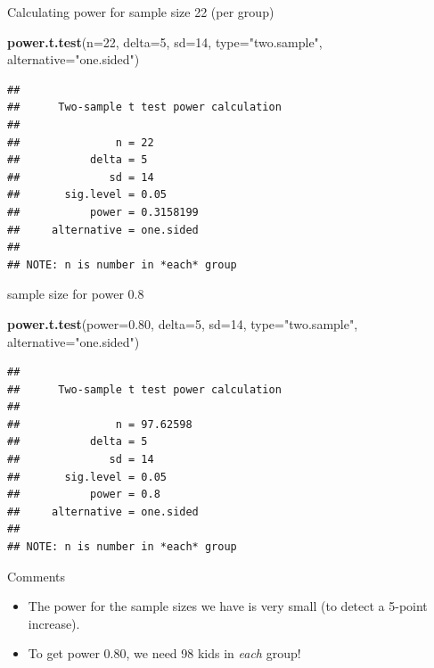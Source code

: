 \documentclass[ignorenonframetext,]{beamer}
\newenvironment{Shaded}{\begin{snugshade}}{\end{snugshade}}
\newcommand{\DataTypeTok}[1]{\textcolor[rgb]{0.13,0.29,0.53}{#1}}
\newcommand{\DecValTok}[1]{\textcolor[rgb]{0.00,0.00,0.81}{#1}}
\newcommand{\FloatTok}[1]{\textcolor[rgb]{0.00,0.00,0.81}{#1}}
\newcommand{\KeywordTok}[1]{\textcolor[rgb]{0.13,0.29,0.53}{\textbf{#1}}}
\newcommand{\NormalTok}[1]{#1}
\newcommand{\StringTok}[1]{\textcolor[rgb]{0.31,0.60,0.02}{#1}}
\providecommand{\tightlist}{%
  \setlength{\itemsep}{0pt}\setlength{\parskip}{0pt}}
\begin{document}
\begin{frame}[fragile]{Calculating power for sample size 22 (per group)}
\protect\hypertarget{calculating-power-for-sample-size-22-per-group}{}

\begin{Shaded}
\begin{Highlighting}[]
\KeywordTok{power.t.test}\NormalTok{(}\DataTypeTok{n=}\DecValTok{22}\NormalTok{, }\DataTypeTok{delta=}\DecValTok{5}\NormalTok{, }\DataTypeTok{sd=}\DecValTok{14}\NormalTok{, }\DataTypeTok{type=}\StringTok{"two.sample"}\NormalTok{, }
             \DataTypeTok{alternative=}\StringTok{"one.sided"}\NormalTok{)}
\end{Highlighting}
\end{Shaded}

\begin{verbatim}
## 
##      Two-sample t test power calculation 
## 
##               n = 22
##           delta = 5
##              sd = 14
##       sig.level = 0.05
##           power = 0.3158199
##     alternative = one.sided
## 
## NOTE: n is number in *each* group
\end{verbatim}

\end{frame}

\begin{frame}[fragile]{sample size for power 0.8}
\protect\hypertarget{sample-size-for-power-0.8}{}

\begin{Shaded}
\begin{Highlighting}[]
\KeywordTok{power.t.test}\NormalTok{(}\DataTypeTok{power=}\FloatTok{0.80}\NormalTok{, }\DataTypeTok{delta=}\DecValTok{5}\NormalTok{, }\DataTypeTok{sd=}\DecValTok{14}\NormalTok{, }\DataTypeTok{type=}\StringTok{"two.sample"}\NormalTok{, }
             \DataTypeTok{alternative=}\StringTok{"one.sided"}\NormalTok{)}
\end{Highlighting}
\end{Shaded}

\begin{verbatim}
## 
##      Two-sample t test power calculation 
## 
##               n = 97.62598
##           delta = 5
##              sd = 14
##       sig.level = 0.05
##           power = 0.8
##     alternative = one.sided
## 
## NOTE: n is number in *each* group
\end{verbatim}

\end{frame}

\begin{frame}{Comments}
\protect\hypertarget{comments-4}{}

\begin{itemize}
\tightlist
\item
  The power for the sample sizes we have is very small (to detect a
  5-point increase).
\item
  To get power 0.80, we need 98 kids in \emph{each} group!
\end{itemize}

\end{frame}
\end{document}
